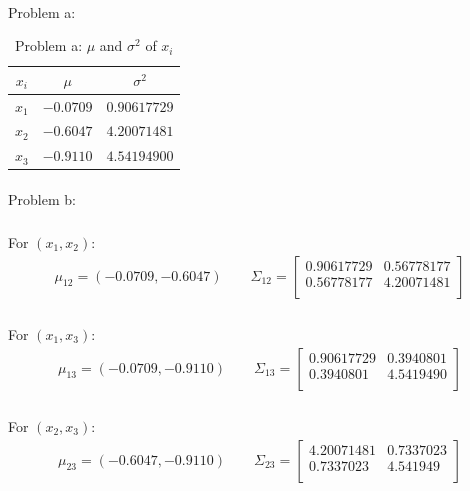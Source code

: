 \documentclass[]{article}
\begin{document}
            \paragraph{}Problem a:
            \begin{table}[h!]
            \centering
            \caption{Problem a: $\mu$ and $\sigma^2$ of $x_i$}
            \begin{tabular}{c|cc}
\hline
$x_i$  &  $\mu$    & $\sigma^2$ \\
\hline            
$x_1$ & $-0.0709$ & $0.90617729$ \\
$x_2$ & $-0.6047$ & $4.20071481$ \\
$x_3$ & $-0.9110$ & $4.54194900$ \\
\hline
            \end{tabular}
            \end{table}
            \paragraph{}Problem b:
                \subparagraph{}For $(x_1,x_2)$:
                \begin{align*}
                \mu_{12} =(-0.0709,-0.6047) 
                \quad\quad
                \Sigma_{12}  =  \begin{bmatrix}
                    0.90617729 & 0.56778177 \\
                    0.56778177 & 4.20071481 \\
                                \end{bmatrix}
                \end{align*}
                \subparagraph{}For $(x_1,x_3)$:
                \begin{align*}
                \mu_{13} =(-0.0709,-0.9110) 
                \quad\quad
                \Sigma_{13}  =  \begin{bmatrix}
                    0.90617729 & 0.3940801\\
                    0.3940801  & 4.5419490\\
                                \end{bmatrix}
                \end{align*}
                \subparagraph{}For $(x_2,x_3)$:
                \begin{align*}
                \mu_{23} =(-0.6047,-0.9110) 
                \quad\quad
                \Sigma_{23} =  \begin{bmatrix}
                    4.20071481 & 0.7337023\\
                    0.7337023 &  4.541949\\
                                \end{bmatrix}
                \end{align*}
\end{document}

